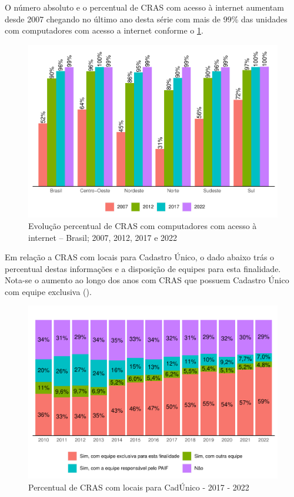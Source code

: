 \documentclass[
  brazilian]{report}
\begin{document}
O número absoluto e o percentual de CRAS com acesso à internet aumentam
desde 2007 chegando no último ano desta série com mais de 99\% das
unidades com computadores com acesso a internet conforme o
\cref{fig:CRAS-internet-percentual}.

\begin{figure}
\includegraphics{Censo-SUAS-2022_files/figure-latex/CRAS-internet-percentual-1} \caption[Evolução percentual de CRAS com computadores com acesso à internet – Brasil]{Evolução percentual de CRAS com computadores com acesso à internet – Brasil; 2007, 2012, 2017 e 2022}\label{fig:CRAS-internet-percentual}
\end{figure}

Em relação a CRAS com locais para Cadastro Único, o dado abaixo trás o
percentual destas informações e a disposição de equipes para esta
finalidade. Nota-se o aumento ao longo dos anos com CRAS que possuem
Cadastro Único com equipe exclusiva ().

\begin{figure}
\includegraphics{Censo-SUAS-2022_files/figure-latex/equip-cadunico-cras-1} \caption[Percentual de CRAS com locais para CadÚnico - 2017 - 2022]{Percentual de CRAS com locais para CadÚnico - 2017 - 2022}\label{fig:equip-cadunico-cras}
\end{figure}
\end{document}
